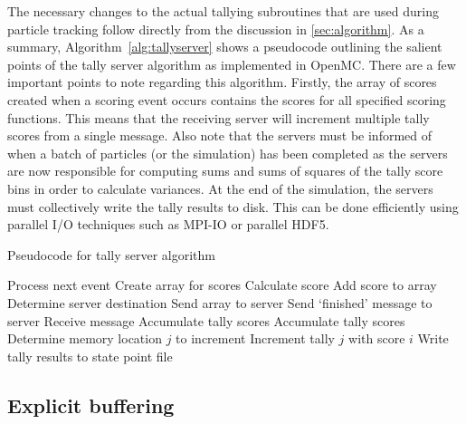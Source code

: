 \documentclass[3p]{elsarticle}
\begin{document}
The necessary changes to the actual tallying subroutines that are used during
particle tracking follow directly from the discussion in
\autoref{sec:algorithm}. As a summary, Algorithm~\ref{alg:tallyserver} shows a
pseudocode outlining the salient points of the tally server algorithm as
implemented in OpenMC. There are a few important points to note regarding this
algorithm. Firstly, the array of scores created when a scoring event occurs
contains the scores for all specified scoring functions. This means that the
receiving server will increment multiple tally scores from a single
message. Also note that the servers must be informed of when a batch of
particles (or the simulation) has been completed as the servers are now
responsible for computing sums and sums of squares of the tally score bins in
order to calculate variances. At the end of the simulation, the servers must
collectively write the tally results to disk. This can be done efficiently using
parallel I/O techniques such as MPI-IO or parallel HDF5.

\begin{algorithm}
  \caption{Pseudocode for tally server algorithm}
  \label{alg:tallyserver}
  \begin{algorithmic}
            \State Process next event
              \State Create array for scores
                \State Calculate score
                \State Add score to array
              \EndFor
              \State Determine server destination
              \State Send array to server
            \EndIf
          \EndWhile
        \EndFor
        \State Send `finished' message to server
      \EndFor
      \Loop
        \State Receive message
          \State Accumulate tally scores
          \State Accumulate tally scores
        \Else
          \State Determine memory location $j$ to increment
          \State Increment tally $j$ with score $i$
          \EndFor
        \EndIf
      \EndLoop
      \State Write tally results to state point file
    \EndIf
  \end{algorithmic}
\end{algorithm}

\subsection{Explicit buffering}
\end{document}
